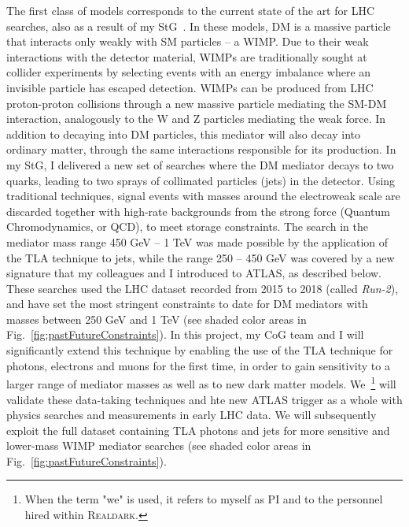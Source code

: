 \documentclass[11pt,a4paper]{article}
\begin{document}
The first class of models corresponds to the current state of the art for LHC searches, also as a result of my StG~\cite{Abercrombie:2015wmb,Boveia:2018yeb}. 
In these models, DM is a massive particle that interacts only weakly with SM particles -- a WIMP. 
Due to their weak interactions with the detector material, WIMPs are traditionally sought at collider experiments by selecting events with an energy imbalance where an invisible particle has escaped detection. 
WIMPs can be produced from LHC proton-proton collisions through a new massive particle mediating the SM-DM interaction, analogously to the W and Z particles mediating the weak force. 
In addition to decaying into DM particles, this mediator will also decay into ordinary matter, through the same interactions responsible for its production. 
In my StG, I delivered a new set of searches where the DM mediator decays to two quarks, leading to two sprays of collimated particles (jets) in the detector. 
Using traditional techniques, signal events with masses around the electroweak scale are discarded together with high-rate backgrounds from the strong force (Quantum Chromodynamics, or QCD), to meet storage constraints.
The search in the mediator mass range 450 GeV -- 1 TeV was made possible by the application of the TLA technique to jets,
while the range 250 -- 450 GeV was covered by a new signature that my colleagues and I introduced to ATLAS, as described below. 
These searches used the LHC dataset recorded from 2015 to 2018 (called \textit{Run-2}), and have set the most stringent constraints to date for DM mediators with masses between 250 GeV and 1 TeV (see shaded \color{red} color \color{black} areas in Fig.~\ref{fig:pastFutureConstraints}). 
In this project, my CoG team and I will significantly extend this technique by enabling the use of the TLA technique for photons, electrons and muons for the first time, in order to gain sensitivity to a larger range of mediator masses as well as to new dark matter models. 
We~\footnote{When the term "we" is used, it refers to myself as PI and to the personnel hired within \textsc{Realdark}.} will validate these data-taking techniques and hte new ATLAS trigger as a whole with physics searches and measurements in early LHC data. 
We will subsequently exploit the full dataset containing TLA photons and jets for more sensitive and lower-mass WIMP mediator searches (see shaded \color{red} color \color{black} areas in Fig.~\ref{fig:pastFutureConstraints}). 
\end{document}
